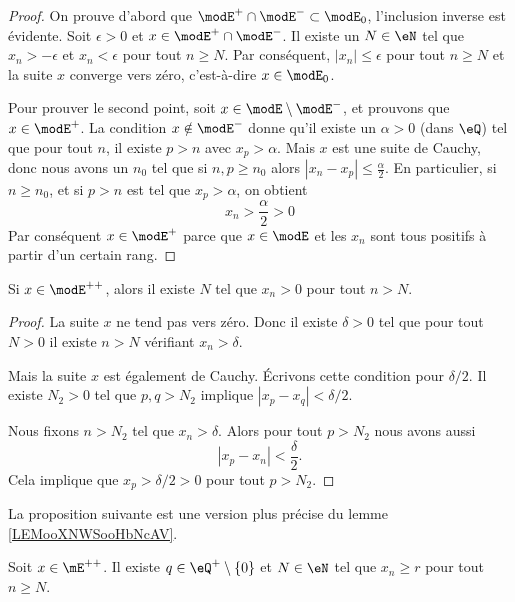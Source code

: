\begin{proof}
    On prouve d'abord que \( \modE^+\cap\modE^-\subset\modE_0\), l'inclusion inverse est évidente. Soit \( \epsilon>0\) et \( x\in \modE^+\cap\modE^-\). Il existe un \( N\in \eN\) tel que \( x_n>-\epsilon\) et \( x_n<\epsilon\) pour tout \( n\geq N\). Par conséquent, \( | x_n |\leq \epsilon\) pour tout \( n\geq N\) et la suite \( x\) converge vers zéro, c'est-à-dire \( x\in\modE_0\).

    Pour prouver le second point, soit \( x\in \modE\setminus\modE^-\), et prouvons que \( x\in\modE^+\). La condition \( x\notin \modE^-\) donne qu'il existe un \( \alpha>0\) (dans \( \eQ\)) tel que pour tout \( n\), il existe \( p>n\) avec \( x_p>\alpha\). Mais \( x\) est une suite de Cauchy, donc nous avons un \( n_0\) tel que si \( n,p\geq n_0\) alors \( | x_n-x_p |\leq \frac{ \alpha }{2}\). En particulier, si \( n\geq n_0\), et si \( p>n\) est tel que \( x_p>\alpha\), on obtient
    \begin{equation}
        x_n>\frac{ \alpha }{2}>0
    \end{equation}
    Par conséquent \( x\in\modE^+\) parce que \( x\in\modE\) et les \( x_n \) sont tous positifs à partir d'un certain rang.
\end{proof}

\begin{lemma}        \label{LEMooXNWSooHbNcAV}
    Si \( x\in \modE^{++}\), alors il existe \( N\) tel que \( x_n>0\) pour tout \( n>N\).
\end{lemma}

\begin{proof}
    La suite \( x\) ne tend pas vers zéro. Donc il existe \( \delta>0\) tel que pour tout \( N>0\) il existe \( n>N\) vérifiant \( x_n>\delta\).

    Mais la suite \( x\) est également de Cauchy. Écrivons cette condition pour \( \delta/2\). Il existe \( N_2>0\) tel que \( p,q>N_2\) implique \( | x_p-x_q |<\delta/2\).

    Nous fixons \( n>N_2\) tel que \( x_n>\delta\). Alors pour tout \( p>N_2\) nous avons aussi
    \begin{equation}
        | x_p-x_n |<\frac{ \delta }{2}.
    \end{equation}
    Cela implique que \( x_p>\delta/2>0\) pour tout \( p>N_2\).
\end{proof}

La proposition suivante est une version plus précise du lemme \ref{LEMooXNWSooHbNcAV}.
\begin{proposition}
    Soit \( x\in \mE^{++}\). Il existe \( q\in \eQ^+\setminus\{ 0 \}\) et \( N\in \eN\) tel que \( x_n\geq r\) pour tout \( n\geq N\).
\end{proposition}

